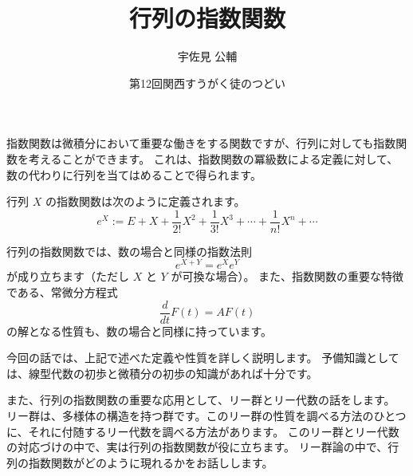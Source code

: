\documentclass{ltjsarticle}
\title{行列の指数関数}
\author{宇佐見 公輔}
\date{第12回関西すうがく徒のつどい}
\begin{document}
\maketitle

指数関数は微積分において重要な働きをする関数ですが、行列に対しても指数関数を考えることができます。
これは、指数関数の冪級数による定義に対して、数の代わりに行列を当てはめることで得られます。

行列 \(X\) の指数関数は次のように定義されます。
\[
    e^X := E + X + \frac{1}{2!}X^2 + \frac{1}{3!}X^3 + \cdots + \frac{1}{n!}X^n + \cdots
\]

行列の指数関数では、数の場合と同様の指数法則
\[
    e^{X + Y} = e^X e^Y
\]
が成り立ちます（ただし \(X\) と \(Y\) が可換な場合）。
また、指数関数の重要な特徴である、常微分方程式
\[
    \frac{d}{dt} F(t) = A F(t)
\]
の解となる性質も、数の場合と同様に持っています。

今回の話では、上記で述べた定義や性質を詳しく説明します。
予備知識としては、線型代数の初歩と微積分の初歩の知識があれば十分です。

また、行列の指数関数の重要な応用として、リー群とリー代数の話をします。
リー群は、多様体の構造を持つ群です。このリー群の性質を調べる方法のひとつに、それに付随するリー代数を調べる方法があります。
このリー群とリー代数の対応づけの中で、実は行列の指数関数が役に立ちます。
リー群論の中で、行列の指数関数がどのように現れるかをお話しします。
\end{document}
